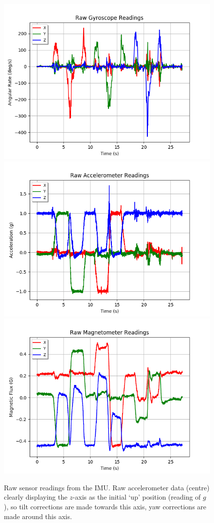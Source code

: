 \documentclass[11pt]{article}
\begin{document}
\begin{figure}[htp]

\centering
\includegraphics[width=.32\textwidth]{gyro-unaltered}\hfill
\includegraphics[width=.32\textwidth]{acc-unaltered}\hfill
\includegraphics[width=.32\textwidth]{mag-unaltered}

\caption{Raw sensor readings from the IMU. Raw accelerometer data (centre) clearly displaying the $z$-axis as the initial `up' position (reading of $g$), so tilt corrections are made towards this axis, yaw corrections are made around this axis.}
\label{fig:raw-readings}

\end{figure}
\end{document}
